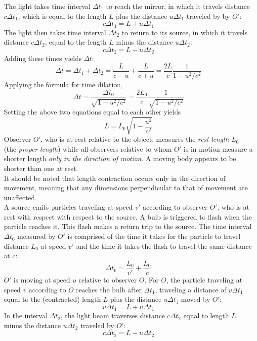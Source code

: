 \documentclass{subfiles}
\begin{document}
				The light takes time interval \(\Delta t_1\) to reach the mirror, in which it travels distance \(c\Delta t_1\), which is equal to the length \(L\) plus the distance \(u\Delta t_1\) traveled by by \(O'\):
				\[c\Delta t_1 = L + u\Delta t_1\]
				The light then takes time interval \(\Delta t_2\) to return to its source, in which it travels distance \(c\Delta t_2\), equal to the length \(L\) minus the distance \(u\Delta t_2\):
				\[c\Delta t_2 = L - u\Delta t_2\]
				Adding these times yields \(\Delta t\):
				\[
					\Delta t = \Delta t_1 + \Delta t_2
						= \frac{L}{c - u} + \frac{L}{c + u}
						= \frac{2L}{c}\frac{1}{1 - u^2/c^2}
				\]
				Applying the formula for time dilation,
				\[
					\Delta t = \frac{\Delta t_0}{\sqrt{1 - u^2/c^2}}
						= \frac{2L_0}{c}\frac{1}{\sqrt{1 - u^2/c^2}}
				\]
				Setting the above two equations equal to each other yields
				\[L = L_0\sqrt{1 - \frac{u^2}{c^2}} \tag{length contraction}\]
				Observer \(O'\), who is at rest relative to the object, measures the \textit{rest length \(L_0\)} (the \textit{proper length}) while all observers relative to whom \(O'\) is in motion measure a shorter length \textit{only in the direction of motion}.
				A moving body appears to be shorter than one at rest. \\
				It should be noted that length contraction occurs only in the direction of movement, meaning that any dimensions perpendicular to that of movement are unaffected. \\
			A source emits particles traveling at speed \(v'\) according to observer \(O'\), who is at rest with respect with respect to the source. A bulb is triggered to flash when the particle reaches it. This flash makes a return trip to the source. The time interval \(\Delta t_0\) measured by \(O'\) is comprised of the time it takes for the particle to travel distance \(L_0\) at speed \(v'\) and the time it takes the flash to travel the same distance at \(c\):
				\[\Delta t_0 = \frac{L_0}{v'} + \frac{L_0}{c}\]
				\(O'\) is moving at speed \(u\) relative to observer \(O\). For \(O\), the particle traveling at speed \(v\) according to \(O\) reaches the bulb after \(\Delta t_1\), traveling a distance of \(v\Delta t_1\) equal to the (contracted) length \(L\) plus the distance \(u\Delta t_1\) moved by \(O'\):
				\[v\Delta t_1 = L + u\Delta t_1\]
				In the interval \(\Delta t_2\), the light beam traverses distance \(c\Delta t_2\) equal to length \(L\) minus the distance \(u\Delta t_2\) traveled by \(O'\):
				\[c\Delta t_2 = L - u\Delta t_2\]
\end{document}
